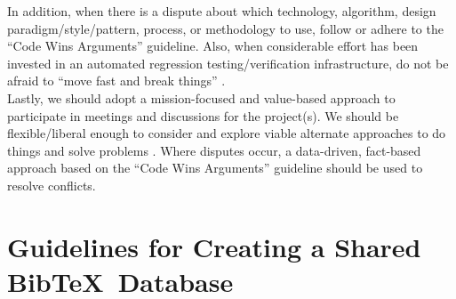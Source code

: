 \documentclass[letter,12pt]{article}
\begin{document}

In addition, when there is a dispute about which technology, algorithm, design paradigm/style/pattern, process, or methodology to use, follow or adhere to the ``Code Wins Arguments'' \cite{Kushner2011,Zuckerberg2012} guideline. Also, when considerable effort has been invested in an automated regression testing/verification infrastructure, do not be afraid to ``move fast and break things'' \cite{Fong2011,Evangelista2012}. \\

Lastly, we should adopt a mission-focused and value-based approach to participate in meetings and discussions for the project(s). We should be flexible/liberal enough to consider and explore viable alternate approaches to do things and solve problems \cite{Beedle2001,Beedle2001a}. Where disputes occur, a data-driven, fact-based approach based on the ``Code Wins Arguments'' guideline should be used to resolve conflicts.

\section{Guidelines for Creating a Shared {\sc Bib}\TeX\ Database}
\label{sec:GuidelinesforCreatingaSharedBibTeXDatabase}
\end{document}

